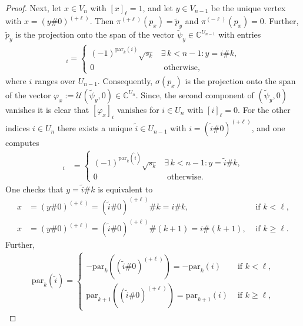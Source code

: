 \documentclass[a4paper]{amsart}
\newcommand{\C}{\mathbb{C}}
\begin{document}
\begin{proof}
    Next, let $x \in V_n$ with $[x]_\ell = 1$, and let $y \in V_{n-1}$ be the unique vertex with $x = (y \# 0)^{(+\ell)}$. Then $\pi^{(+\ell)}(p_x) = \tilde{p}_y$ and $\pi^{(-\ell)}(p_x) = 0$. Further, $\tilde{p}_y$ is the projection onto the span of the vector $\tilde{\psi}_y \in \C^{U_{n-1}}$ with entries
    \begin{align*}
        [\tilde{\psi}_y]_i = \begin{cases}
            (-1)^{\mathrm{par}_k(i)} \sqrt{s_k}     &\exists \, k < n-1 : y = i \# k, \\
            0                                       &\text{ otherwise},
        \end{cases}
    \end{align*}
    where $i$ ranges over $U_{n-1}$.
    Consequently, $\sigma(p_x)$ is the projection onto the span of the vector $\varphi_x := \mathcal{U} (\tilde{\psi}_y, 0) \in \C^{U_n}$. Since, the second component of $(\tilde{\psi}_y, 0)$ vanishes it is clear that $[\varphi_x]_i$ vanishes for $i \in U_n$ with $[i]_\ell = 0$. For the other indices $i \in U_n$ there exists a unique $\tilde{i} \in U_{n-1}$ with $i = (\tilde{i} \# 0)^{(+\ell)}$, and one computes
    \begin{align*}
        [\varphi_x]_{i} &= \begin{cases}
            (-1)^{\mathrm{par}_k(\tilde{i})} \sqrt{s_k}     &\exists \, k < n-1 : y = \tilde{i} \# k, \\
            0                                       &\text{ otherwise.}
        \end{cases}
    \end{align*}
    One checks that $y = \tilde{i} \# k$ is equivalent to
    \begin{align*}
            x &= (y \# 0)^{(+\ell)} = (\tilde{i} \# 0)^{(+\ell)} \# k = i \# k, & \text{ if } k < \ell, \\
            x &= (y \# 0)^{(+\ell)} = (\tilde{i} \# 0)^{(+\ell)} \# (k+1) = i \# (k+1), & \text{ if } k \geq \ell.
    \end{align*}
    Further,
    \begin{align*}
        \mathrm{par}_k(\tilde{i}) = \begin{cases}
            - \mathrm{par}_k((\tilde{i} \# 0)^{(+\ell)}) = -\mathrm{par}_k(i)    &\text{ if } k < \ell, \\
            \mathrm{par}_{k+1}((\tilde{i} \# 0)^{(+\ell)}) = \mathrm{par}_{k+1}(i)   &\text{ if } k \geq \ell,
        \end{cases}

\end{align*}
\end{proof}
\end{document}
